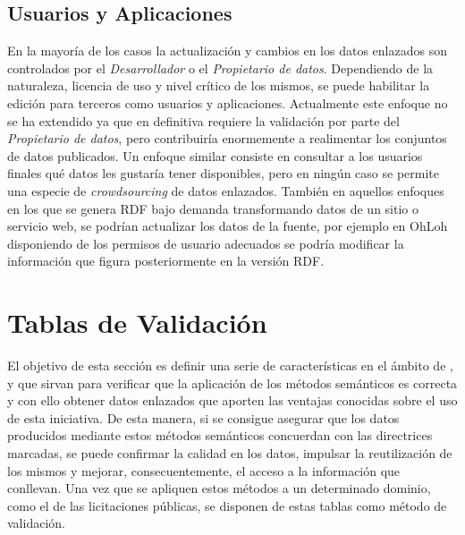 \subsection{Usuarios y Aplicaciones}
En la mayoría de los casos la actualización y cambios en los datos enlazados son controlados
por el \textit{Desarrollador} o el \textit{Propietario de datos}. Dependiendo de la naturaleza, licencia
de uso y nivel crítico de los mismos, se puede habilitar la edición para terceros como 
usuarios y aplicaciones. Actualmente este enfoque no se ha extendido ya que en definitiva 
requiere la validación por parte del \textit{Propietario de datos}, pero contribuiría enormemente 
a realimentar los conjuntos de datos publicados. Un enfoque similar consiste en consultar a los usuarios finales qué datos les gustaría
tener disponibles, pero en ningún caso se permite una especie de \textit{crowdsourcing} de datos
enlazados. También en aquellos enfoques en los que se genera \gls{RDF} bajo demanda transformando
datos de un sitio o servicio web, se podrían actualizar los datos de la fuente, por ejemplo
en OhLoh disponiendo de los permisos de usuario adecuados se podría modificar la información 
que figura posteriormente en la versión RDF.

\section{Tablas de Validación}\label{sect:tablas-validacion}
El objetivo de esta sección es definir una serie de características 
en el ámbito de \linkeddata, \opendata y \lod que sirvan para verificar que
la aplicación de los métodos semánticos es correcta y con ello obtener
datos enlazados que aporten las ventajas conocidas sobre el uso
de esta iniciativa. De esta manera, si se consigue asegurar que los datos
producidos mediante estos métodos semánticos concuerdan con las directrices marcadas, se puede confirmar la calidad en los datos, 
impulsar la reutilización de los mismos y mejorar, consecuentemente, el acceso a la información que conllevan. Una vez
que se apliquen estos métodos a un determinado dominio, como el de las licitaciones públicas, se disponen de estas tablas como método de validación. 

